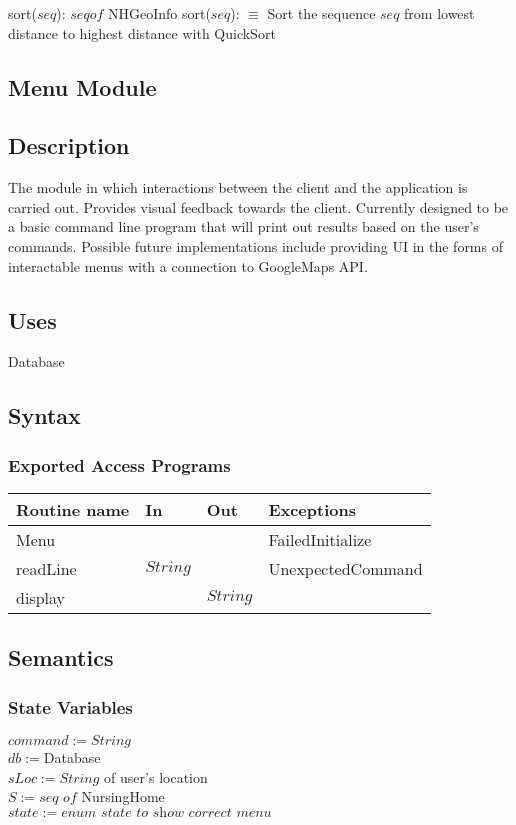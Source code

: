 \documentclass[12pt]{article}
\begin{document}
\noindent sort($seq$): $seq of $ NHGeoInfo
\noindent sort($seq$): $ \equiv $ Sort the sequence $seq$ from lowest distance to highest distance with QuickSort

\newpage
\subsection{Menu Module}

\subsection* {Description}

The module in which interactions between the client and the application is carried out. Provides visual feedback towards the client. Currently designed to be a basic command line program that will print out results based on the user's commands. Possible future implementations include providing UI in the forms of interactable menus with a connection to GoogleMaps API.

\subsection*{Uses}
Database

\subsection* {Syntax}

\subsubsection* {Exported Access Programs}

\begin{tabular}{| l | l | l | p{6cm} |}
\hline
\textbf{Routine name} & \textbf{In} & \textbf{Out} & \textbf{Exceptions}\\
\hline
Menu & ~ & ~ & FailedInitialize\\
\hline
readLine & $String$ & ~ & UnexpectedCommand\\
\hline
display & ~ & $String$ & ~\\
\hline
\end{tabular}

\subsection* {Semantics}

\subsubsection* {State Variables}
\noindent $command := String$ \\
\noindent $db := $Database \\
\noindent $sLoc := String$ of user's location \\
\noindent $S := \textit{seq of}$ NursingHome \\
\noindent $state := \textit{enum state to show correct menu}$ \\
\end{document}
